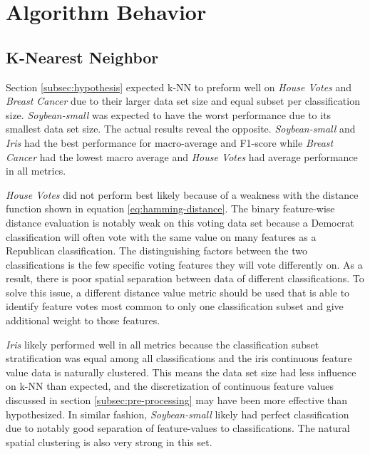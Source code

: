 \section{Algorithm Behavior} \label{sec:alg-behavior}

\subsection{K-Nearest Neighbor}
Section \ref{subsec:hypothesis} expected k-NN to preform well on \textit{House Votes} and \textit{Breast Cancer} due to their larger data set size and equal subset per classification size.
\textit{Soybean-small} was expected to have the worst performance due to its smallest data set size.
The actual results reveal the opposite. 
\textit{Soybean-small} and \textit{Iris} had the best performance for macro-average and F1-score while \textit{Breast Cancer} had the lowest macro average and \textit{House Votes} had average performance in all metrics.

\textit{House Votes} did not perform best likely because of a weakness with the distance function shown in equation \ref{eq:hamming-distance}.
The binary feature-wise distance evaluation is notably weak on this voting data set because a Democrat classification will often vote with the same value on many features as a Republican classification.
The distinguishing factors between the two classifications is the few specific voting features they will vote differently on.
As a result, there is poor spatial separation between data of different classifications.
To solve this issue, a different distance value metric should be used that is able to identify feature votes most common to only one classification subset and give additional weight to those features.

\textit{Iris} likely performed well in all metrics because the classification subset stratification was equal among all classifications and the iris continuous feature value data is naturally clustered.
This means the data set size had less influence on k-NN than expected, and the discretization of continuous feature values discussed in section \ref{subsec:pre-processing} may have been more effective than hypothesized.
In similar fashion, \textit{Soybean-small} likely had perfect classification due to notably good separation of feature-values to classifications.
The natural spatial clustering is also very strong in this set.

